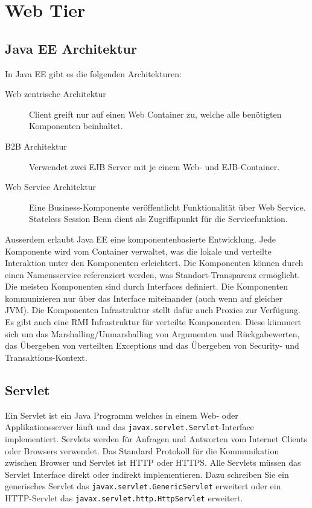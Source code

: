 \chapter{Web Tier}

\section{Java EE Architektur}

In Java EE gibt es die folgenden Architekturen:

\begin{description}
	\item[Web zentrische Architektur] Client greift nur auf einen Web Container zu, welche alle benötigten Komponenten beinhaltet.
	\item[B2B Architektur] Verwendet zwei EJB Server mit je einem Web- und EJB-Container.
	\item[Web Service Architektur] Eine Business-Komponente veröffentlicht Funktionalität über Web Service. Stateless Session Bean dient als Zugriffspunkt für die Servicefunktion.
\end{description}

Ausserdem erlaubt Java EE eine komponentenbasierte Entwicklung. Jede Komponente wird vom Container verwaltet, was die lokale und verteilte Interaktion unter den Komponenten erleichtert. Die Komponenten können durch einen Namensservice referenziert werden, was Standort-Transparenz ermöglicht. Die meisten Komponenten sind durch Interfaces definiert. Die Komponenten kommunizieren nur über das Interface miteinander (auch wenn auf gleicher JVM). Die Komponenten Infrastruktur stellt dafür auch Proxies zur Verfügung. Es gibt auch eine RMI Infrastruktur für verteilte Komponenten. Diese kümmert sich um das Marshalling/Unmarshalling von Argumenten und Rückgabewerten, das Übergeben von verteilten Exceptions und das Übergeben von Security- und Transaktions-Kontext.

\section{Servlet}

Ein Servlet ist ein Java Programm welches in einem Web- oder Applikationsserver läuft und das \verb|javax.servlet.Servlet|-Interface implementiert. Servlets werden für Anfragen und Antworten vom Internet Clients oder Browsers verwendet. Das Standard Protokoll für die Kommunikation zwischen Browser und Servlet ist HTTP oder HTTPS. Alle Servlets müssen das Servlet Interface direkt oder indirekt implementieren. Dazu schreiben Sie ein generisches Servlet das
\verb|javax.servlet.GenericServlet| erweitert oder ein HTTP-Servlet das \verb|javax.servlet.http.HttpServlet| erweitert.

